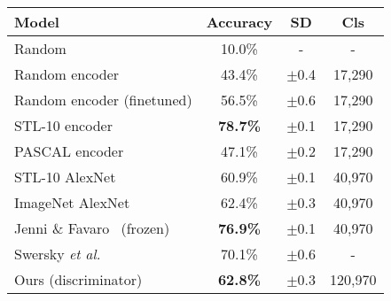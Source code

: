 \documentclass[a4paper,12pt]{report}
\begin{document}
\begin{table}[ht!]
\centering
\begin{tabular}{l c c|c}
\Xhline{0.8pt}
\textbf{Model} & \textbf{Accuracy} & \textbf{SD} & \textbf{Cls}\\
\hline
Random & 10.0\% & - & - \\
Random encoder & 43.4\% & $\pm$0.4 & 17,290 \\ %
Random encoder (finetuned) & 56.5\% & $\pm$0.6 & 17,290 \\ %
\hline
STL-10 encoder & \textbf{78.7\%} & $\pm$0.1 & 17,290 \\ %
PASCAL encoder & 47.1\% & $\pm$0.2 & 17,290 \\ %
STL-10 AlexNet & 60.9\% & $\pm$0.1 & 40,970 \\ %
ImageNet AlexNet & 62.4\% & $\pm$0.3 & 40,970 \\ %
\hline
Jenni \& Favaro~\cite{SpotArtifacts} (frozen) & \textbf{76.9\%} & $\pm$0.1 & 40,970 \\
Swersky \textit{et al.}~\cite{Stl10TlExp2Comp} & 70.1\% & $\pm$0.6 & - \\
\hline
Ours (discriminator) & \textbf{62.8\%}  & $\pm$0.3 & 120,970 \\ %

\end{tabular}
\end{table}
\end{document}
